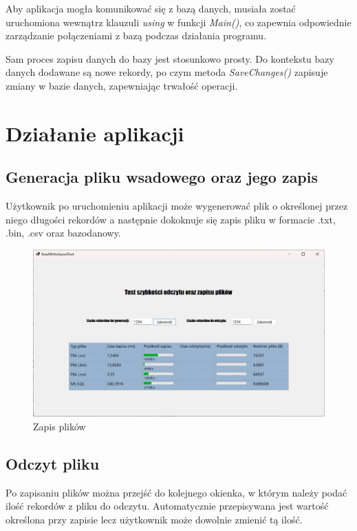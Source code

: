 \documentclass{report}
\begin{document}
Aby aplikacja mogła komunikować się z bazą danych, musiała zostać uruchomiona wewnątrz klauzuli \textit{using} w funkcji \textit{Main()}, co zapewnia odpowiednie zarządzanie połączeniami z bazą podczas działania programu.

Sam proces zapisu danych do bazy jest stosunkowo prosty. Do kontekstu bazy danych dodawane są nowe rekordy, po czym metoda \textit{SaveChanges()} zapisuje zmiany w bazie danych, zapewniając trwałość operacji.

\section{Działanie aplikacji}
\subsection{Generacja pliku wsadowego oraz jego zapis}
Użytkownik po uruchomieniu aplikacji może wygenerować plik o określonej przez niego długości rekordów a następnie dokoknuje się zapis pliku w formacie .txt, .bin, .csv oraz bazodanowy.

\begin{figure}[h]
\centering
\includegraphics[width=15cm]{img/zapis.jpg}
\caption{Zapis plików}
\end{figure}

\subsection{Odczyt pliku}
Po zapisaniu plików można przejść do kolejnego okienka, w którym należy podać ilość rekordów z pliku do odczytu. Automatycznie przepisywana jest wartość określona przy zapisie lecz użytkownik może dowolnie zmienić tą ilość.
\end{document}
